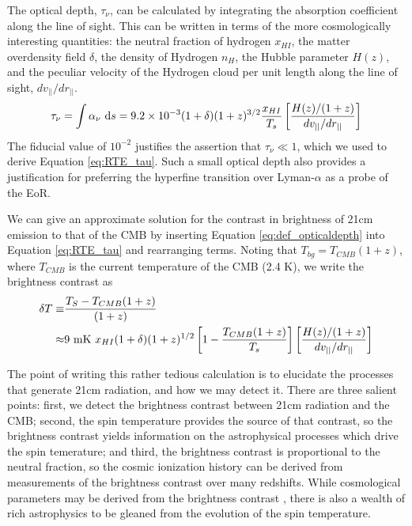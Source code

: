 The optical depth, $\tau_\nu$, can be calculated by integrating the absorption coefficient along the
line of sight. This can be written in terms of the more cosmologically interesting quantities:
the neutral fraction of hydrogen $x_{HI}$, the matter overdensity field $\delta$, the density of Hydrogen
$n_H$, the Hubble parameter $H(z)$, and the peculiar velocity 
of the Hydrogen cloud per unit length along the line of sight, $dv_{||}/dr_{||}$.
\begin{equation}
  \tau_\nu = \int \alpha_\nu\ \mathrm{d}s = 9.2\times10^{-3}(1+\delta)(1+z)^{3/2}\frac{x_{HI}}{T_s}
  \left[\frac{H(z)/(1+z)}{dv_{||}/dr_{||}}\right]
  \label{eq:def_opticaldepth}
\end{equation}
The fiducial value of $10^{-2}$ justifies the assertion that $\tau_\nu \ll 1$, which we used to derive
Equation \ref{eq:RTE_tau}. Such a small optical depth also provides a justification for preferring 
the hyperfine transition over Lyman-$\alpha$ as a probe of the EoR.

We can give an approximate solution for the contrast in brightness of 21cm emission to that of the
CMB by inserting Equation \ref{eq:def_opticaldepth} into Equation \ref{eq:RTE_tau} and rearranging
terms. Noting that $T_{bg} = T_{CMB}(1+z)$, where $T_{CMB}$ is the current temperature of the CMB
(2.4 K), we write the brightness contrast as
\begin{align}
  \delta T \equiv& \frac{T_S - T_{CMB}(1+z)}{(1+z)}
  \nonumber \\ \approx&
  9\ {\rm mK}\ x_{HI}(1+\delta)(1+z)^{1/2}
  \left[1 - \frac{T_{CMB}(1+z)}{T_s}\right]
    \left[\frac{H(z)/(1+z)}{dv_{||}/dr_{||}}\right]
  \label{eq:def_Tcontrast}
\end{align}

The point of writing this rather tedious calculation is to elucidate the processes that
generate 21cm radiation, and how we may detect it. There are three salient points: first, we detect the
brightness contrast between 21cm radiation and the CMB; second, the spin temperature provides the
source of that contrast, so the brightness contrast yields information on the astrophysical
processes which drive the spin temerature; and third, the brightness contrast is proportional to the
neutral fraction, so the cosmic ionization history can be derived from measurements of the
brightness contrast over many redshifts. While cosmological parameters may be derived from the
brightness contrast \cite{McQuinn2006}, there is also a wealth of rich astrophysics to be gleaned
from the evolution of the spin temperature. 

